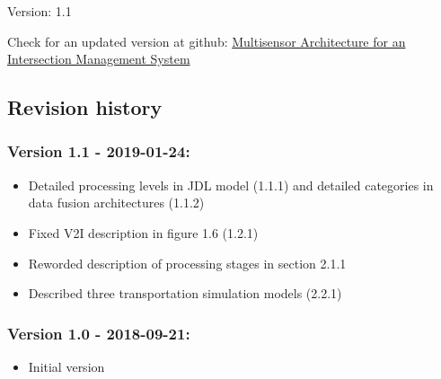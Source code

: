 \begin{titlepage}
    \begin{center}
%   
%        
%		        
%        
%        
%        
%		
%        
{}
Version: 1.1 \\
\vspace{2cm}

      
\end{center}
    
Check for an updated version at github: 
\href{https://github.com/gustavovelascoh/msc-report/raw/master/main.pdf}{Multisensor Architecture for an Intersection Management System}


\subsection*{Revision history}
\subsubsection*{Version 1.1 - 2019-01-24:}

	\begin{itemize}
	\item Detailed processing levels in JDL model (1.1.1) and detailed categories in data fusion architectures (1.1.2)
	\item Fixed V2I description in figure 1.6 (1.2.1)
	\item Reworded description of processing stages in section 2.1.1
	\item Described three transportation simulation models (2.2.1)
	\end{itemize}


\subsubsection*{Version 1.0 - 2018-09-21:}
	\begin{itemize}
	\item Initial version
	\end{itemize}


\end{titlepage}